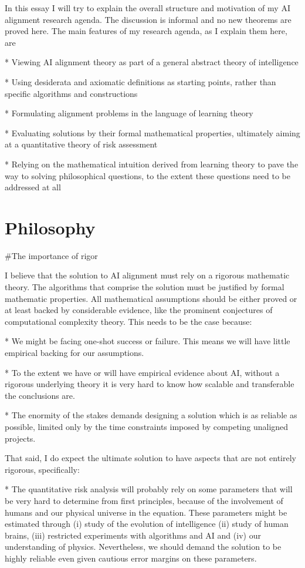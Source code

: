 \documentclass[a4paper]{article}
\begin{document}
In this essay I will try to explain the overall structure and motivation of my AI alignment research agenda. The discussion is informal and no new theorems are proved here. The main features of my research agenda, as I explain them here, are 

* Viewing AI alignment theory as part of a general abstract theory of intelligence

* Using desiderata and axiomatic definitions as starting points, rather than specific algorithms and constructions

* Formulating alignment problems in the language of learning theory

* Evaluating solutions by their formal mathematical properties, ultimately aiming at a quantitative theory of risk assessment

* Relying on the mathematical intuition derived from learning theory to pave the way to solving philosophical questions, to the extent these questions need to be addressed at all

\section{Philosophy}

\#The importance of rigor

I believe that the solution to AI alignment must rely on a rigorous mathematic theory. The algorithms that comprise the solution must be justified by formal mathematic properties. All mathematical assumptions should be either proved or at least backed by considerable evidence, like the prominent conjectures of computational complexity theory. This needs to be the case because:

* We might be facing one-shot success or failure. This means we will have little empirical backing for our assumptions.

* To the extent we have or will have empirical evidence about AI, without a rigorous underlying theory it is very hard to know how scalable and transferable the conclusions are.

* The enormity of the stakes demands designing a solution which is as reliable as possible, limited only by the time constraints imposed by competing unaligned projects.

That said, I do expect the ultimate solution to have aspects that are not entirely rigorous, specifically:

* The quantitative risk analysis will probably rely on some parameters that will be very hard to determine from first principles, because of the involvement of humans and our physical universe in the equation. These parameters might be estimated through (i) study of the evolution of intelligence (ii) study of human brains, (iii) restricted experiments with algorithms and AI and (iv) our understanding of physics. Nevertheless, we should demand the solution to be highly reliable even given cautious error margins on these parameters.
\end{document}
